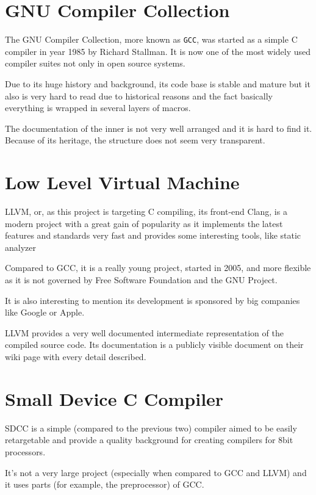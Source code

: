     \section{GNU Compiler Collection}

    The GNU Compiler Collection, more known as \texttt{GCC}, was started as a simple C compiler in year 1985 by Richard Stallman. It is now one of the most widely used compiler suites not only in open source systems.

    Due to its huge history and background, its code base is stable and mature but it also is very hard to read due to historical reasons and the fact basically everything is wrapped in several layers of macros.

    The documentation of the inner %
    is not very well arranged and it is hard to find it. Because of its heritage, the structure does not seem very transparent.

    \section{Low Level Virtual Machine}

    LLVM, or, as this project is targeting C compiling, its front-end Clang, is a modern project with a great gain of popularity as it implements the latest features and standards very fast and provides some interesting tools, like static analyzer

    Compared to GCC, it is a really young project, started in 2005, and more flexible as it is not governed by Free Software Foundation and the GNU Project.

    It is also interesting to mention its development is sponsored by big companies like Google or Apple.

    LLVM provides a very well documented intermediate representation of the compiled source code. Its documentation is a publicly visible document on their wiki page with every detail described.

    \section{Small Device C Compiler}

    SDCC is a simple (compared to the previous two) compiler aimed to be easily retargetable and provide a quality background for creating compilers for 8bit processors.

    It's not a very large project (especially when compared to GCC and LLVM) and it uses parts (for example, the preprocessor) of GCC.

